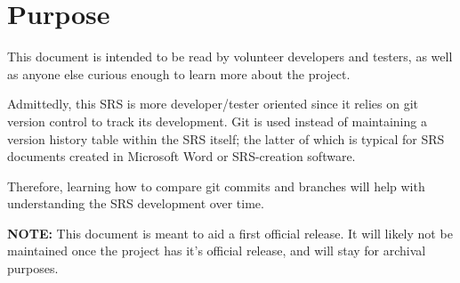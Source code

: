 \section{Purpose}

This document is intended to be read by volunteer developers and testers, as well as anyone else curious enough to learn more about the project.

Admittedly, this SRS is more developer/tester oriented since it relies on git version control to track its development. Git is  used instead of maintaining a version history table within the SRS itself; the latter of which is typical for SRS documents created in Microsoft Word or SRS-creation software.

Therefore, learning how to compare git commits and branches will help with understanding the SRS development over time. 

\textbf{NOTE:} This document is meant to aid a first official release. It will likely not be maintained once the project has it's official release, and will stay for archival purposes.


